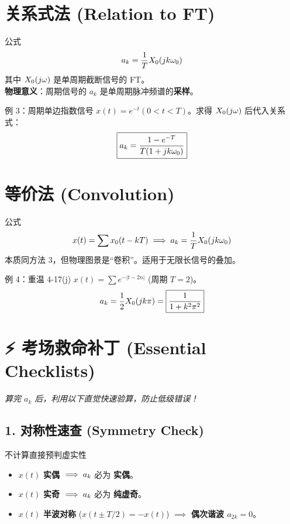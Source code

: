 \section{关系式法 (Relation to FT)}
\begin{corebox}{公式}
    \[ a_k = \frac{1}{T} X_{0}(jk\omega_0) \]
    其中 $X_0(j\omega)$ 是单周期截断信号的 FT。
    \\ \textbf{物理意义}：周期信号的 $a_k$ 是单周期脉冲频谱的\textbf{采样}。
\end{corebox}

\begin{examplebox}{例 3：周期单边指数信号}
    $x(t) = e^{-t} (0<t<T)$。求得 $X_0(j\omega)$ 后代入关系式：
    \[ \boxed{a_k = \frac{1 - e^{-T}}{T(1 + jk\omega_0)}} \]
\end{examplebox}

\section{等价法 (Convolution)}
\begin{corebox}{公式}
    \[ x(t) = \sum x_0(t-kT) \implies a_k = \frac{1}{T} X_0(jk\omega_0) \]
    本质同方法 3，但物理图景是“卷积”。适用于无限长信号的叠加。
\end{corebox}

\begin{examplebox}{例 4：重温 4-17(j)}
    $x(t) = \sum e^{-|t-2n|}$ (周期 $T=2$)。
    \[ a_k = \frac{1}{2} X_0(jk\pi) = \boxed{\frac{1}{1 + k^2\pi^2}} \]
\end{examplebox}


\section{⚡ 考场救命补丁 (Essential Checklists)}
\textit{算完 $a_k$ 后，利用以下直觉快速验算，防止低级错误！}

\subsection*{1. 对称性速查 (Symmetry Check)}

\begin{alertbox}{不计算直接预判虚实性}
    \begin{itemize}
        \item $x(t)$ \textbf{实偶} $\implies a_k$ 必为 \textbf{实偶}。
        \item $x(t)$ \textbf{实奇} $\implies a_k$ 必为 \textbf{纯虚奇}。
        \item $x(t)$ \textbf{半波对称} ($x(t \pm T/2) = -x(t)$) $\implies$ \textbf{偶次谐波 $a_{2k}=0$}。
    \end{itemize}
\end{alertbox}

